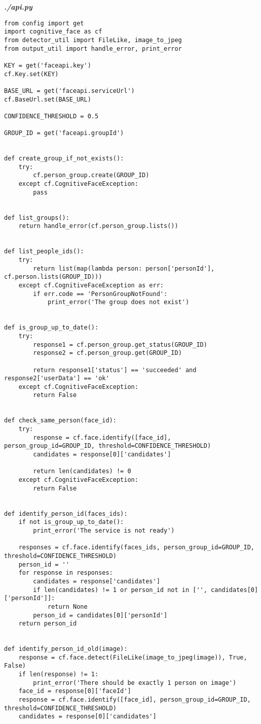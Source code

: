 \textit{\textbf{./api.py}}
\begin{verbatim}
from config import get
import cognitive_face as cf
from detector_util import FileLike, image_to_jpeg
from output_util import handle_error, print_error

KEY = get('faceapi.key')
cf.Key.set(KEY)

BASE_URL = get('faceapi.serviceUrl')
cf.BaseUrl.set(BASE_URL)

CONFIDENCE_THRESHOLD = 0.5

GROUP_ID = get('faceapi.groupId')


def create_group_if_not_exists():
    try:
        cf.person_group.create(GROUP_ID)
    except cf.CognitiveFaceException:
        pass


def list_groups():
    return handle_error(cf.person_group.lists())


def list_people_ids():
    try:
        return list(map(lambda person: person['personId'], cf.person.lists(GROUP_ID)))
    except cf.CognitiveFaceException as err:
        if err.code == 'PersonGroupNotFound':
            print_error('The group does not exist')


def is_group_up_to_date():
    try:
        response1 = cf.person_group.get_status(GROUP_ID)
        response2 = cf.person_group.get(GROUP_ID)

        return response1['status'] == 'succeeded' and response2['userData'] == 'ok'
    except cf.CognitiveFaceException:
        return False


def check_same_person(face_id):
    try:
        response = cf.face.identify([face_id], person_group_id=GROUP_ID, threshold=CONFIDENCE_THRESHOLD)
        candidates = response[0]['candidates']

        return len(candidates) != 0
    except cf.CognitiveFaceException:
        return False


def identify_person_id(faces_ids):
    if not is_group_up_to_date():
        print_error('The service is not ready')

    responses = cf.face.identify(faces_ids, person_group_id=GROUP_ID, threshold=CONFIDENCE_THRESHOLD)
    person_id = ''
    for response in responses:
        candidates = response['candidates']
        if len(candidates) != 1 or person_id not in ['', candidates[0]['personId']]:
            return None
        person_id = candidates[0]['personId']
    return person_id


def identify_person_id_old(image):
    response = cf.face.detect(FileLike(image_to_jpeg(image)), True, False)
    if len(response) != 1:
        print_error('There should be exactly 1 person on image')
    face_id = response[0]['faceId']
    response = cf.face.identify([face_id], person_group_id=GROUP_ID, threshold=CONFIDENCE_THRESHOLD)
    candidates = response[0]['candidates']


\end{verbatim}
